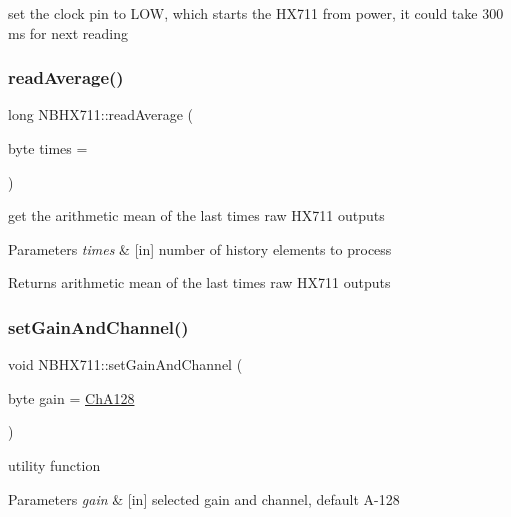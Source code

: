 set the clock pin to L\+OW, which starts the H\+X711 from power, it could take 300 ms for next reading \mbox{\label{class_n_b_h_x711_ac1f2090347e4f56911cf9d8aae81b8f1}} 
\subsubsection{\texorpdfstring{read\+Average()}{readAverage()}}
{\footnotesize\ttfamily long N\+B\+H\+X711\+::read\+Average (\begin{DoxyParamCaption}\item[{byte}]{times = {} }\end{DoxyParamCaption})}

get the arithmetic mean of the last times raw H\+X711 outputs 
\begin{DoxyParams}{Parameters}
{\em times} & \mbox{[}in\mbox{]} number of history elements to process \\
\hline
\end{DoxyParams}
\begin{DoxyReturn}{Returns}
arithmetic mean of the last times raw H\+X711 outputs 
\end{DoxyReturn}
\mbox{\label{class_n_b_h_x711_a802d60de582161056e577b4c6d32ba53}} 
\subsubsection{\texorpdfstring{set\+Gain\+And\+Channel()}{setGainAndChannel()}}
{\footnotesize\ttfamily void N\+B\+H\+X711\+::set\+Gain\+And\+Channel (\begin{DoxyParamCaption}\item[{byte}]{gain = {\ttfamily \hyperlink{_n_b_h_x711_8h_aed3330beebe77c0cd49207584f624d86a622bf1aeb6d57be63f86d39c8bfd53e1}{Ch\+A128}} }\end{DoxyParamCaption})}

utility function 
\begin{DoxyParams}{Parameters}
{\em gain} & \mbox{[}in\mbox{]} selected gain and channel, default A-\/128 \\
\hline
\end{DoxyParams}
\mbox{\label{class_n_b_h_x711_abb5f2f5ecf96f5cfc19fc0a96ea95b6c}} 
